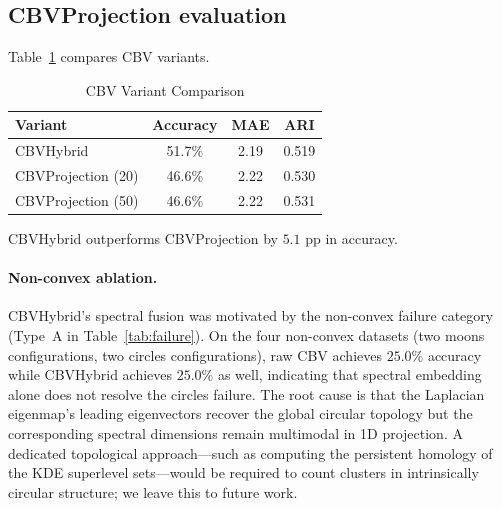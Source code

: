 \documentclass[journal]{IEEEtran}
\begin{document}
\begin{table}[t]
\centering
\caption{CBV Failure Taxonomy}
\label{tab:failure}
\end{table}

\subsection{CBVProjection evaluation}
\label{sec:projection-eval}

Table~\ref{tab:variants} compares CBV variants.

\begin{table}[t]
\centering
\caption{CBV Variant Comparison}
\label{tab:variants}
\small
\begin{tabular}{lccc}
\toprule
Variant & Accuracy & MAE & ARI\\
\midrule
CBVHybrid & 51.7\% & 2.19 & 0.519\\
CBVProjection (20) & 46.6\% & 2.22 & 0.530\\
CBVProjection (50) & 46.6\% & 2.22 & 0.531\\
\bottomrule
\end{tabular}
\end{table}

CBVHybrid outperforms CBVProjection by $5.1$ pp in accuracy.

\paragraph{Non-convex ablation.}
CBVHybrid's spectral fusion was motivated by the non-convex failure category (Type~A in Table~\ref{tab:failure}). On the four non-convex datasets (two moons configurations, two circles configurations), raw CBV achieves $25.0\%$ accuracy while CBVHybrid achieves $25.0\%$ as well, indicating that spectral embedding alone does not resolve the circles failure. The root cause is that the Laplacian eigenmap's leading eigenvectors recover the global circular topology but the corresponding spectral dimensions remain multimodal in 1D projection. A dedicated topological approach---such as computing the persistent homology of the KDE superlevel sets---would be required to count clusters in intrinsically circular structure; we leave this to future work.
\end{document}
